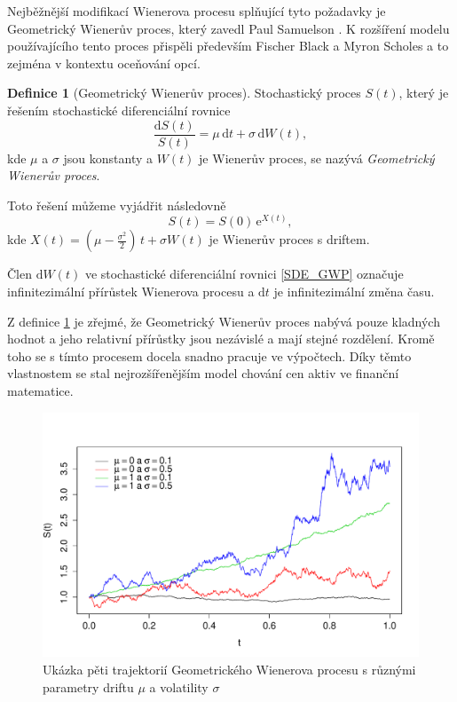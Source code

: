 \documentclass[a4paper,12pt]{report}
\theoremstyle{definition} \newtheorem{definice}[veta]{Definice}
\theoremstyle{remark}
\begin{document}
Nejběžnější modifikací Wienerova procesu splňující tyto požadavky je Geometrický Wienerův proces, který zavedl Paul Samuelson \cite{samuelson1964rational}.
K rozšíření modelu používajícího tento proces přispěli především Fischer Black a Myron Scholes \cite{black1973pricing} a to zejména v kontextu oceňování opcí.
\begin{definice}[Geometrický Wienerův proces]\label{Geometricky_Wieneruv_proces}
Stochastický proces $S(t)$, který je řešením stochastické diferenciální rovnice
\begin{equation}\label{SDE_GWP}
\frac{\mathrm{d} S(t)}{S(t)} = \mu\,\mathrm{d}t + \sigma\,\mathrm{d}W (t), 
\end{equation}
kde  $\mu$ a $\sigma$ jsou konstanty a $W (t)$ je Wienerův proces,
se nazývá \textit{Geometrický Wienerův proces}.

Toto řešení můžeme vyjádřit následovně
\begin{equation}\label{GWP}
S(t) = S(0)\,\mathrm{e}^{X(t)},
\end{equation}
kde $X(t) = (\mu - \frac{\sigma^2}{2})\,t + \sigma W (t)$ je Wienerův proces s driftem.
\end{definice}
Člen $\mathrm{d}W(t)$ ve stochastické diferenciální rovnici \eqref{SDE_GWP} označuje infinitezimální přírůstek Wienerova procesu a $\mathrm{d}t$ je infinitezimální změna času.

Z definice \ref{Geometricky_Wieneruv_proces} je zřejmé, že Geometrický Wienerův proces nabývá pouze kladných hodnot a jeho relativní přírůstky jsou nezávislé a mají stejné rozdělení. 
Kromě toho se s tímto procesem docela snadno pracuje ve výpočtech. 
Díky těmto vlastnostem se stal nejrozšířenějším model chování cen aktiv ve finanční matematice.

\begin{figure}[!htbp]
  \centering 
	\includegraphics[width=13.5cm, clip, trim= 0 15 25 50]{IMG/GP_v2.pdf}
  \caption{Ukázka pěti trajektorií Geometrického Wienerova procesu s různými parametry driftu $\mu$ a volatility $\sigma$}  \label{GP_graf}
\end{figure}
\end{document}
